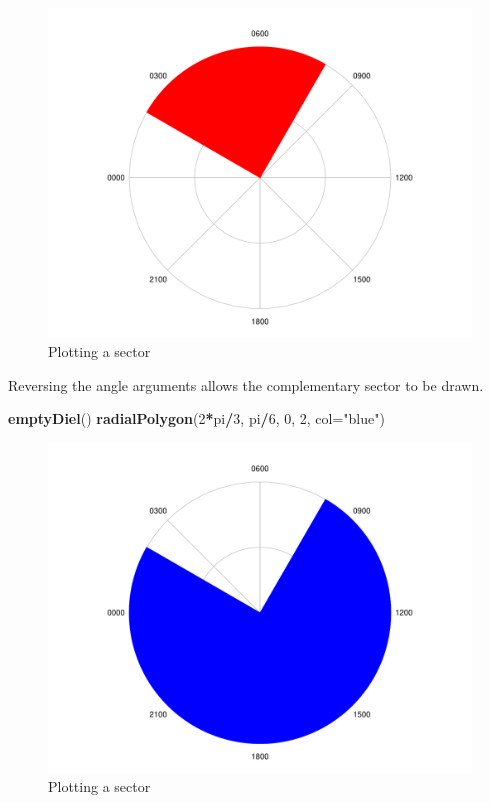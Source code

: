 \documentclass[
]{book}
\newenvironment{Shaded}{\begin{snugshade}}{\end{snugshade}}
\newcommand{\AttributeTok}[1]{\textcolor[rgb]{0.13,0.29,0.53}{#1}}
\newcommand{\DecValTok}[1]{\textcolor[rgb]{0.00,0.00,0.81}{#1}}
\newcommand{\FunctionTok}[1]{\textcolor[rgb]{0.13,0.29,0.53}{\textbf{#1}}}
\newcommand{\NormalTok}[1]{#1}
\newcommand{\SpecialCharTok}[1]{\textcolor[rgb]{0.81,0.36,0.00}{\textbf{#1}}}
\newcommand{\StringTok}[1]{\textcolor[rgb]{0.31,0.60,0.02}{#1}}
\begin{document}
\begin{figure}

{\centering \includegraphics[width=0.9\linewidth]{_main_files/figure-latex/radialPolygon-sector-1} 

}

\caption{Plotting a sector}\label{fig:radialPolygon-sector}
\end{figure}

Reversing the angle arguments allows the complementary sector to be drawn.

\begin{Shaded}
\begin{Highlighting}[]
\FunctionTok{emptyDiel}\NormalTok{()}
\FunctionTok{radialPolygon}\NormalTok{(}\DecValTok{2}\SpecialCharTok{*}\NormalTok{pi}\SpecialCharTok{/}\DecValTok{3}\NormalTok{, pi}\SpecialCharTok{/}\DecValTok{6}\NormalTok{, }\DecValTok{0}\NormalTok{, }\DecValTok{2}\NormalTok{, }\AttributeTok{col=}\StringTok{"blue"}\NormalTok{)}
\end{Highlighting}
\end{Shaded}

\begin{figure}

{\centering \includegraphics[width=0.9\linewidth]{_main_files/figure-latex/radialPolygon-sector2-1} 

}

\caption{Plotting a sector}\label{fig:radialPolygon-sector2}
\end{figure}
\end{document}
